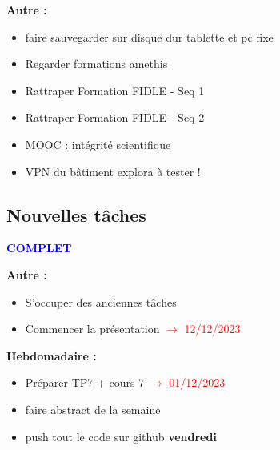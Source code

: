 \textbf{Autre :}
\begin{itemize}[label=$\square$] 
	\item[\previous{4}] faire sauvegarder sur disque dur tablette et pc fixe
	\item[\previous{6}] Regarder formations amethis
	\item[\previous{7}] Rattraper Formation FIDLE - Seq 1
	\item[\previous{8}] Rattraper Formation FIDLE - Seq 2
	\item[\previous{8}] MOOC : intégrité scientifique
	\item[\previous{8}] VPN du bâtiment explora à tester !
\end{itemize}

\subsection*{Nouvelles tâches}

\textcolor{blue}{\textbf{\large{COMPLET}}}

\textbf{Autre :}
\begin{itemize}[label=$\square$] 
	\item[\done] S'occuper des anciennes tâches
	\item[\done] Commencer la présentation \textcolor{red}{$\rightarrow$ 12/12/2023}
\end{itemize}
\textbf{Hebdomadaire :}
\begin{itemize}[label=$\square$] 
	\item[\done] Préparer TP7 + cours 7 \textcolor{red}{$\rightarrow$ 01/12/2023}
	\item[\done] faire abstract de la semaine 
	\item[\done] push tout le code sur github \textbf{vendredi}
\end{itemize}